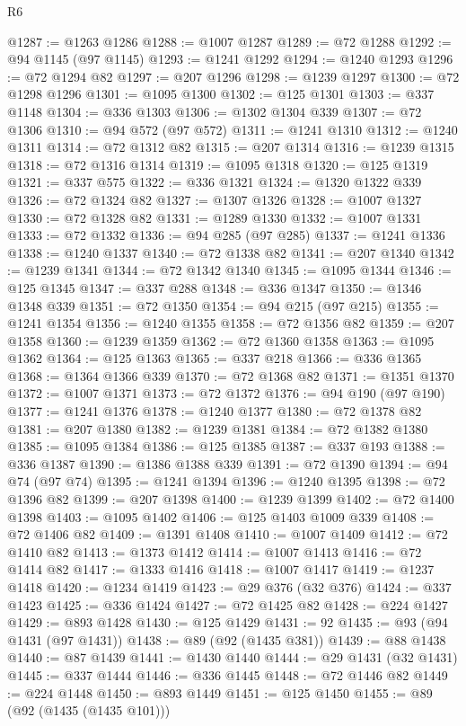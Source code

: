 \begin{lexlean}{R6}
\begin{coremodule}
@1287 := @1263 @1286
@1288 := @1007 @1287
@1289 := @72 @1288
@1292 := @94 @1145 (@97 @1145)
@1293 := @1241 @1292
@1294 := @1240 @1293
@1296 := @72 @1294 @82
@1297 := @207 @1296
@1298 := @1239 @1297
@1300 := @72 @1298 @1296
@1301 := @1095 @1300
@1302 := @125 @1301
@1303 := @337 @1148
@1304 := @336 @1303
@1306 := @1302 @1304 @339
@1307 := @72 @1306
@1310 := @94 @572 (@97 @572)
@1311 := @1241 @1310
@1312 := @1240 @1311
@1314 := @72 @1312 @82
@1315 := @207 @1314
@1316 := @1239 @1315
@1318 := @72 @1316 @1314
@1319 := @1095 @1318
@1320 := @125 @1319
@1321 := @337 @575
@1322 := @336 @1321
@1324 := @1320 @1322 @339
@1326 := @72 @1324 @82
@1327 := @1307 @1326
@1328 := @1007 @1327
@1330 := @72 @1328 @82
@1331 := @1289 @1330
@1332 := @1007 @1331
@1333 := @72 @1332
@1336 := @94 @285 (@97 @285)
@1337 := @1241 @1336
@1338 := @1240 @1337
@1340 := @72 @1338 @82
@1341 := @207 @1340
@1342 := @1239 @1341
@1344 := @72 @1342 @1340
@1345 := @1095 @1344
@1346 := @125 @1345
@1347 := @337 @288
@1348 := @336 @1347
@1350 := @1346 @1348 @339
@1351 := @72 @1350
@1354 := @94 @215 (@97 @215)
@1355 := @1241 @1354
@1356 := @1240 @1355
@1358 := @72 @1356 @82
@1359 := @207 @1358
@1360 := @1239 @1359
@1362 := @72 @1360 @1358
@1363 := @1095 @1362
@1364 := @125 @1363
@1365 := @337 @218
@1366 := @336 @1365
@1368 := @1364 @1366 @339
@1370 := @72 @1368 @82
@1371 := @1351 @1370
@1372 := @1007 @1371
@1373 := @72 @1372
@1376 := @94 @190 (@97 @190)
@1377 := @1241 @1376
@1378 := @1240 @1377
@1380 := @72 @1378 @82
@1381 := @207 @1380
@1382 := @1239 @1381
@1384 := @72 @1382 @1380
@1385 := @1095 @1384
@1386 := @125 @1385
@1387 := @337 @193
@1388 := @336 @1387
@1390 := @1386 @1388 @339
@1391 := @72 @1390
@1394 := @94 @74 (@97 @74)
@1395 := @1241 @1394
@1396 := @1240 @1395
@1398 := @72 @1396 @82
@1399 := @207 @1398
@1400 := @1239 @1399
@1402 := @72 @1400 @1398
@1403 := @1095 @1402
@1406 := @125 @1403 @1009 @339
@1408 := @72 @1406 @82
@1409 := @1391 @1408
@1410 := @1007 @1409
@1412 := @72 @1410 @82
@1413 := @1373 @1412
@1414 := @1007 @1413
@1416 := @72 @1414 @82
@1417 := @1333 @1416
@1418 := @1007 @1417
@1419 := @1237 @1418
@1420 := @1234 @1419
@1423 := @29 @376 (@32 @376)
@1424 := @337 @1423
@1425 := @336 @1424
@1427 := @72 @1425 @82
@1428 := @224 @1427
@1429 := @893 @1428
@1430 := @125 @1429
@1431 := 92
@1435 := @93 (@94 @1431 (@97 @1431))
@1438 := @89 (@92 (@1435 @381))
@1439 := @88 @1438
@1440 := @87 @1439
@1441 := @1430 @1440
@1444 := @29 @1431 (@32 @1431)
@1445 := @337 @1444
@1446 := @336 @1445
@1448 := @72 @1446 @82
@1449 := @224 @1448
@1450 := @893 @1449
@1451 := @125 @1450
@1455 := @89 (@92 (@1435 (@1435 @101)))

\end{coremodule}
\end{lexlean}
